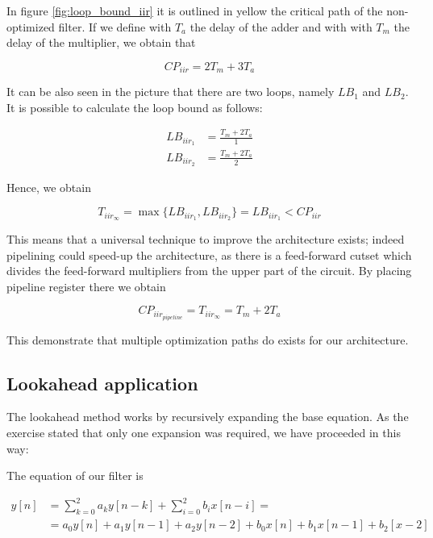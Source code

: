In figure \ref{fig:loop_bound_iir} it is outlined in yellow the critical path of the non-optimized filter. If we define with
$T_{a}$ the delay of the adder and with with $T_{m}$ the delay of the multiplier, we obtain that

\begin{equation}
    \label{eq:baseline_iir_delay}
    CP_{iir} = 2T_{m} + 3T_{a}
\end{equation}

It can be also seen in the picture that there are two loops, namely $LB_{1}$ and $LB_{2}$. It is possible to calculate the
loop bound as follows:

\begin{align}
    LB_{iir_{1}} &= \frac{T_{m} + 2T_{a}}{1} \\
    LB_{iir_{2}} &= \frac{T_{m} + 2T_{a}}{2}
\end{align}

Hence, we obtain

\begin{equation}
    T_{iir_{\infty}} = \max \lbrace LB_{iir_{1}}, LB_{iir_{2}} \rbrace = LB_{iir_{1}} < CP_{iir}
\end{equation}

This means that a universal technique to improve the architecture exists; indeed pipelining could speed-up the architecture,
as there is a feed-forward cutset which divides the feed-forward multipliers from the upper part of the circuit. By placing
pipeline register there we obtain

\begin{equation}
    CP_{iir_{pipeline}} = T_{iir_{\infty}} = T_{m} + 2T_{a}
\end{equation}

This demonstrate that multiple optimization paths do exists for our architecture.

\subsection{Lookahead application}

The lookahead method works by recursively expanding the base equation. As the exercise stated that only one expansion was required,
we have proceeded in this way:

The equation of our filter is

\begin{equation}
    \label{eq:iir_eq}
    \begin{split}
        y[n] &= {\sum_{k=0}^{2} a_{k}y[n-k]} + {\sum_{i=0}^{2} b_{i}x[n-i]} = \\
        &= a_{0}y[n] + a_{1}y[n-1] + a_{2}y[n-2] + b_{0}x[n] + b_{1}x[n-1] + b_2[x-2]
    \end{split}
\end{equation}

